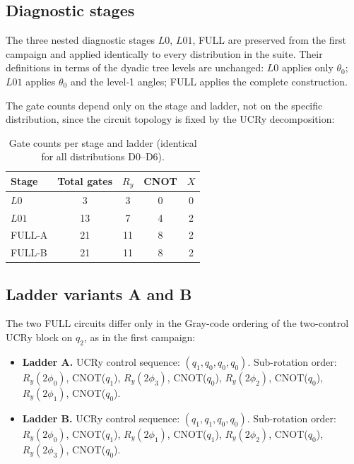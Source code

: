 \documentclass[11pt,a4paper]{article}
\newcommand{\Ry}{R_y}
\begin{document}
\subsection{Diagnostic stages}

The three nested diagnostic stages $L0$, $L01$, FULL are preserved
from the first campaign and applied identically to every
distribution in the suite.
Their definitions in terms of the dyadic tree levels are unchanged:
$L0$ applies only $\theta_0$; $L01$ applies $\theta_0$ and the
level-1 angles; FULL applies the complete construction.

The gate counts depend only on the stage and ladder, not on the
specific distribution, since the circuit topology is fixed by the
UCRy decomposition:

\begin{table}[H]
\centering
\caption{Gate counts per stage and ladder (identical for all
  distributions D0--D6).}
\label{tab:gatecounts}
\begin{tabular}{lcccc}
\toprule
Stage & Total gates & $\Ry$ & CNOT & $X$ \\
\midrule
$L0$    &  3 &  3 & 0 & 0 \\
$L01$   & 13 &  7 & 4 & 2 \\
FULL-A  & 21 & 11 & 8 & 2 \\
FULL-B  & 21 & 11 & 8 & 2 \\
\bottomrule
\end{tabular}
\end{table}

\subsection{Ladder variants A and B}

The two FULL circuits differ only in the Gray-code ordering of the
two-control UCRy block on $q_2$, as in the first campaign:

\begin{itemize}
  \item \textbf{Ladder A.} UCRy control sequence:
    $(q_1, q_0, q_0, q_0)$.
    Sub-rotation order:
    $\Ry(2\phi_0)$, CNOT($q_1$),
    $\Ry(2\phi_3)$, CNOT($q_0$),
    $\Ry(2\phi_2)$, CNOT($q_0$),
    $\Ry(2\phi_1)$, CNOT($q_0$).

  \item \textbf{Ladder B.} UCRy control sequence:
    $(q_1, q_1, q_0, q_0)$.
    Sub-rotation order:
    $\Ry(2\phi_0)$, CNOT($q_1$),
    $\Ry(2\phi_1)$, CNOT($q_1$),
    $\Ry(2\phi_2)$, CNOT($q_0$),
    $\Ry(2\phi_3)$, CNOT($q_0$).
\end{itemize}
\end{document}
